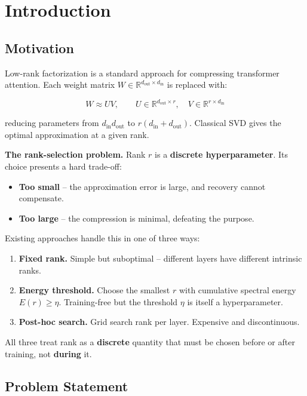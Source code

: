 
\section{Introduction}

\subsection{Motivation}

Low-rank factorization is a standard approach for compressing transformer 
attention. Each weight matrix $W \in \mathbb{R}^{d_\text{out} \times d_\text{in}}$ 
is replaced with:

\[
W \approx U V, \qquad
U \in \mathbb{R}^{d_\text{out} \times r}, \quad
V \in \mathbb{R}^{r \times d_\text{in}}
\tag{1.1}
\]

reducing parameters from $d_\text{in} d_\text{out}$ to $r(d_\text{in} + d_\text{out})$. 
Classical SVD gives the optimal approximation at a given rank.

\textbf{The rank-selection problem.} Rank $r$ is a \textbf{discrete hyperparameter}. 
Its choice presents a hard trade-off:

\begin{itemize}
\item \textbf{Too small} -- the approximation error is large, and recovery cannot
  compensate.
\item \textbf{Too large} -- the compression is minimal, defeating the purpose.

\end{itemize}
Existing approaches handle this in one of three ways:

\begin{enumerate}
\item \textbf{Fixed rank.} Simple but suboptimal -- different layers have different
  intrinsic ranks.
\item \textbf{Energy threshold.} Choose the smallest $r$ with cumulative spectral
  energy $E(r) \geq \eta$. Training-free but the threshold $\eta$ is
  itself a hyperparameter.
\item \textbf{Post-hoc search.} Grid search rank per layer. Expensive and
  discontinuous.

\end{enumerate}
All three treat rank as a \textbf{discrete} quantity that must be chosen before 
or after training, not \textbf{during} it.

\subsection{Problem Statement}

